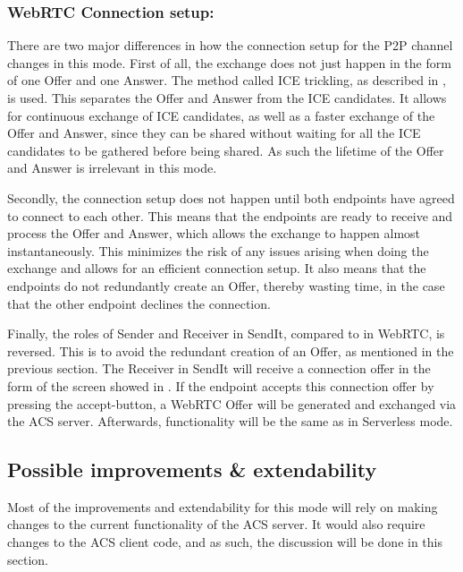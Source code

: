 \subsubsection*{WebRTC Connection setup:}
There are two major differences in how the connection setup for the P2P channel changes in this mode. First of all, the exchange does not just happen in the form of one Offer and one Answer. The method called ICE trickling, as described in , is used. This separates the Offer and Answer from the ICE candidates. It allows for continuous exchange of ICE candidates, as well as a faster exchange of the Offer and Answer, since they can be shared without waiting for all the ICE candidates to be gathered before being shared. As such the lifetime of the Offer and Answer is irrelevant in this mode.

Secondly, the connection setup does not happen until both endpoints have agreed to connect to each other. This means that the endpoints are ready to receive and process the Offer and Answer, which allows the exchange to happen almost instantaneously. This minimizes the risk of any issues arising when doing the exchange and allows for an efficient connection setup. It also means that the endpoints do not redundantly create an Offer, thereby wasting time, in the case that the other endpoint declines the connection.

Finally, the roles of Sender and Receiver in SendIt, compared to in WebRTC, is reversed. This is to avoid the redundant creation of an Offer, as mentioned in the previous section. The Receiver in SendIt will receive a connection offer in the form of the screen showed in . If the endpoint accepts this connection offer by pressing the accept-button, a WebRTC Offer will be generated and exchanged via the ACS server. Afterwards, functionality will be the same as in Serverless mode.
%
\subsection{Possible improvements \& extendability}
%
Most of the improvements and extendability for this mode will rely on making changes to the current functionality of the ACS server. It would also require changes to the ACS client code, and as such, the discussion will be done in this section.

